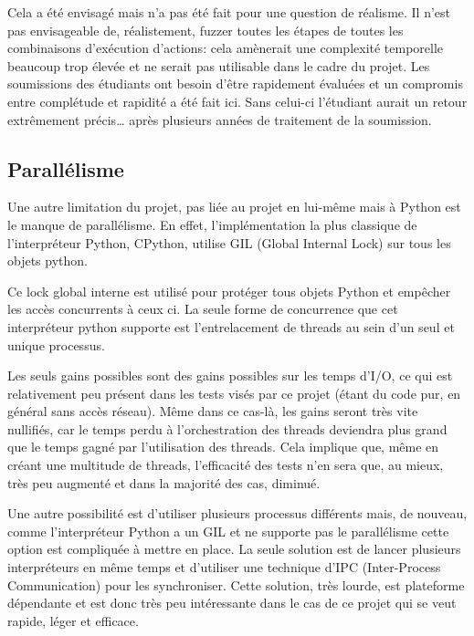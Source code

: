 \documentclass[a4paper]{report}
\begin{document}
Cela a été envisagé mais n'a pas été fait pour une question de réalisme.
Il n'est pas envisageable de, réalistement, fuzzer toutes les étapes de toutes les combinaisons d'exécution d'actions: cela amènerait une complexité temporelle beaucoup trop élevée et ne serait pas utilisable dans le cadre du projet.
Les soumissions des étudiants ont besoin d'être rapidement évaluées et un compromis entre complétude et rapidité a été fait ici.
Sans celui-ci l'étudiant aurait un retour extrêmement précis… après plusieurs années de traitement de la soumission.



\subsection{Parallélisme}

Une autre limitation du projet, pas liée au projet en lui-même mais à Python est le manque de parallélisme.
En effet, l'implémentation la plus classique de l'interpréteur Python, CPython, utilise GIL (Global Internal Lock) sur tous les objets python\cite{archiveThreadStateGIDPython}.

Ce lock global interne est utilisé pour protéger tous objets Python et empêcher les accès concurrents à ceux ci.
La seule forme de concurrence que cet interpréteur python supporte est l'entrelacement de threads au sein d'un seul et unique processus.

Les seuls gains possibles sont des gains possibles sur les temps d'I/O, ce qui est relativement peu présent dans les tests visés par ce projet (étant du code pur, en général sans accès réseau).
Même dans ce cas-là, les gains seront très vite nullifiés, car le temps perdu à l'orchestration des threads deviendra plus grand que le temps gagné par l'utilisation des threads.
Cela implique que, même en créant une multitude de threads, l'efficacité des tests n'en sera que, au mieux, très peu augmenté et dans la majorité des cas, diminué.

Une autre possibilité est d'utiliser plusieurs processus différents mais, de nouveau, comme l'interpréteur Python a un GIL\cite{pythonGlobalInterpreterLockPython} et ne supporte pas le parallélisme cette option est compliquée à mettre en place.
La seule solution est de lancer plusieurs interpréteurs en même temps et d'utiliser une technique d'IPC (Inter-Process Communication) pour les synchroniser.
Cette solution, très lourde, est plateforme dépendante et est donc très peu intéressante dans le cas de ce projet qui se veut rapide, léger et efficace.
\end{document}
